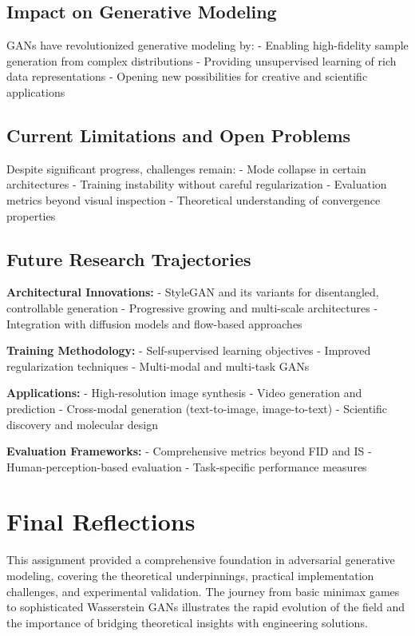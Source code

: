 \documentclass{article}
\begin{document}
\subsection{Impact on Generative Modeling}

GANs have revolutionized generative modeling by:
- Enabling high-fidelity sample generation from complex distributions
- Providing unsupervised learning of rich data representations
- Opening new possibilities for creative and scientific applications

\subsection{Current Limitations and Open Problems}

Despite significant progress, challenges remain:
- Mode collapse in certain architectures
- Training instability without careful regularization
- Evaluation metrics beyond visual inspection
- Theoretical understanding of convergence properties

\subsection{Future Research Trajectories}

\textbf{Architectural Innovations:}
- StyleGAN and its variants for disentangled, controllable generation
- Progressive growing and multi-scale architectures
- Integration with diffusion models and flow-based approaches

\textbf{Training Methodology:}
- Self-supervised learning objectives
- Improved regularization techniques
- Multi-modal and multi-task GANs

\textbf{Applications:}
- High-resolution image synthesis
- Video generation and prediction
- Cross-modal generation (text-to-image, image-to-text)
- Scientific discovery and molecular design

\textbf{Evaluation Frameworks:}
- Comprehensive metrics beyond FID and IS
- Human-perception-based evaluation
- Task-specific performance measures

\section{Final Reflections}

This assignment provided a comprehensive foundation in adversarial generative modeling, covering the theoretical underpinnings, practical implementation challenges, and experimental validation. The journey from basic minimax games to sophisticated Wasserstein GANs illustrates the rapid evolution of the field and the importance of bridging theoretical insights with engineering solutions.
\end{document}
